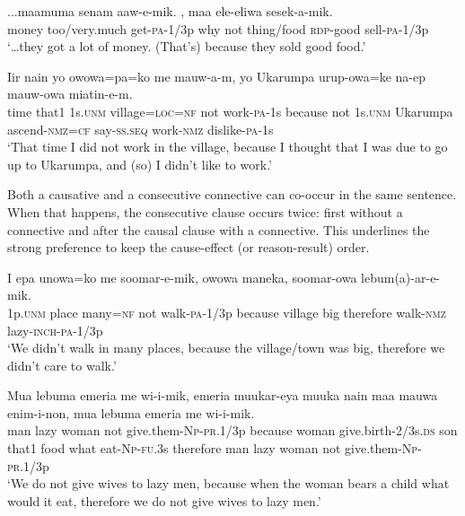 \ea%
\label{ex:8:x1906}
\gll ...maamuma  senam  aaw-e-mik.    , maa  ele-eliwa  sesek-a-mik.\\
money  too/very.much  get-\textsc{pa}-1/3p why not thing/food  \textsc{rdp}-good sell-\textsc{pa}-1/3p\\
\glt`{\dots}they got a lot of money. (That's) because they sold good food.'
\z

 
\ea%
\label{ex:8:x1421}
\gll Iir  nain  yo  owowa=pa=ko  me  mauw-a-m,     yo  Ukarumpa  urup-owa=ke  na-ep mauw-owa  miatin-e-m.\\
time  that1  1s.\textsc{unm} village=\textsc{loc}=\textsc{nf} not  work-\textsc{pa}-1s because  not  1s.\textsc{unm} Ukarumpa  ascend-\textsc{nmz}=\textsc{cf} say-\textsc{ss}.\textsc{seq} work-\textsc{nmz} dislike-\textsc{pa}-1s\\
\glt`That time I did not work in the village, because I thought that I was due to go up to Ukarumpa, and (so) I didn't like to work.'
\z


Both a causative and a consecutive connective can co-occur in the same sentence. When that happens, the consecutive clause occurs twice: first without a connective and after the causal clause with a connective. This underlines the strong preference to keep the cause-effect (or reason-result) order.

\ea%
\label{ex:8:x1422}
\gll I  epa  unowa=ko  me  soomar-e-mik,    owowa maneka,    soomar-owa  lebum(a)-ar-e-mik.\\
1p.\textsc{unm} place  many=\textsc{nf} not  walk-\textsc{pa}-1/3p  because  village big  therefore  walk-\textsc{nmz} lazy-\textsc{inch}-\textsc{pa}-1/3p\\
\glt`We didn't walk in many places, because the village/town was big, therefore we didn't care to walk.'
\z


\ea%
\label{ex:8:x1423}
\gll Mua  lebuma  emeria  me  wi-i-mik,    emeria  muukar-eya  muuka  nain  maa  mauwa  enim-i-non,   mua  lebuma  emeria  me  wi-i-mik.\\
man  lazy  woman  not  give.them-\textsc{Np}-\textsc{pr}.1/3p because  woman give.birth-2/3s.\textsc{ds} son  that1  food  what  eat-\textsc{Np}-\textsc{fu}.3s therefore  man  lazy  woman  not  give.them-\textsc{Np}-\textsc{pr}.1/3p\\
\glt`We do not give wives to lazy men, because when the woman bears a child what would it eat, therefore we do not give wives to lazy men.'
\z


